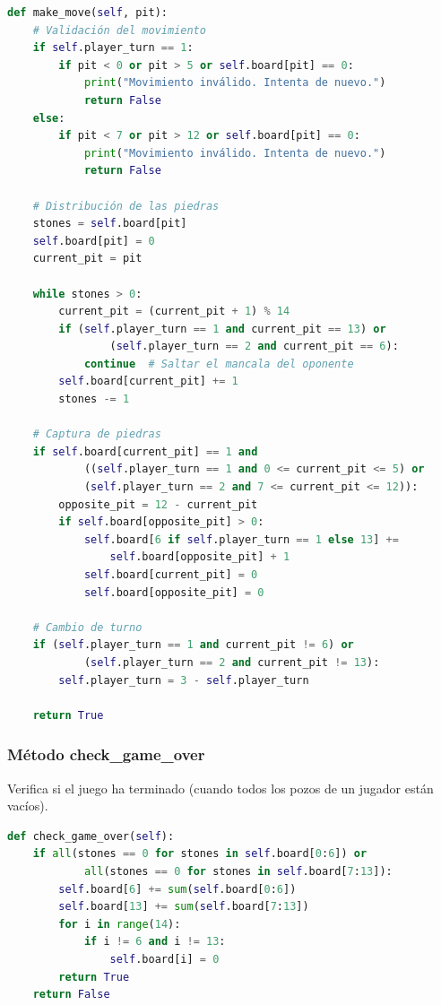 \documentclass[12pt]{article}
\begin{document}
\begin{lstlisting}[language=Python]
def make_move(self, pit):
    # Validación del movimiento
    if self.player_turn == 1:
        if pit < 0 or pit > 5 or self.board[pit] == 0:
            print("Movimiento inválido. Intenta de nuevo.")
            return False
    else:
        if pit < 7 or pit > 12 or self.board[pit] == 0:
            print("Movimiento inválido. Intenta de nuevo.")
            return False

    # Distribución de las piedras
    stones = self.board[pit]
    self.board[pit] = 0
    current_pit = pit

    while stones > 0:
        current_pit = (current_pit + 1) % 14
        if (self.player_turn == 1 and current_pit == 13) or 
                (self.player_turn == 2 and current_pit == 6):
            continue  # Saltar el mancala del oponente
        self.board[current_pit] += 1
        stones -= 1

    # Captura de piedras
    if self.board[current_pit] == 1 and 
            ((self.player_turn == 1 and 0 <= current_pit <= 5) or 
            (self.player_turn == 2 and 7 <= current_pit <= 12)):
        opposite_pit = 12 - current_pit
        if self.board[opposite_pit] > 0:
            self.board[6 if self.player_turn == 1 else 13] += 
                self.board[opposite_pit] + 1
            self.board[current_pit] = 0
            self.board[opposite_pit] = 0

    # Cambio de turno
    if (self.player_turn == 1 and current_pit != 6) or 
            (self.player_turn == 2 and current_pit != 13):
        self.player_turn = 3 - self.player_turn

    return True
\end{lstlisting}

\subsubsection{Método check\_game\_over}
Verifica si el juego ha terminado (cuando todos los pozos de un jugador están vacíos).

\begin{lstlisting}[language=Python]
def check_game_over(self):
    if all(stones == 0 for stones in self.board[0:6]) or 
            all(stones == 0 for stones in self.board[7:13]):
        self.board[6] += sum(self.board[0:6])
        self.board[13] += sum(self.board[7:13])
        for i in range(14):
            if i != 6 and i != 13:
                self.board[i] = 0
        return True
    return False
\end{lstlisting}
\end{document}
